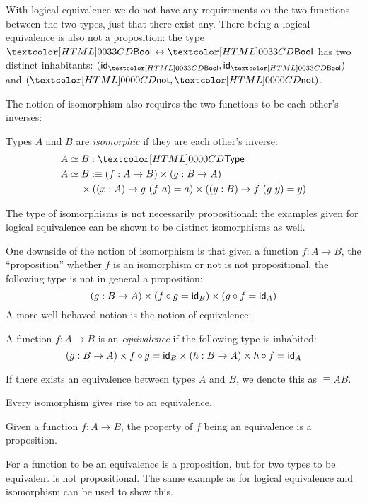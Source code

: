 With logical equivalence we do not have any requirements on the two
functions between the two types, just that there exist any. There
being a logical equivalence is also not a proposition: the type
$\boolty \logequiv \boolty$ has two distinct inhabitants:
$(\id_{\boolty} , \id_{\boolty})$ and $(\boolnot , \boolnot)$.

The notion of isomorphism also requires the two functions to be
each other's inverses:
\begin{definition}[Isomorphism]
  Types $A$ and $B$ are \emph{isomorphic} if they are each other's
  inverse:
  \begin{align*}
    &\Iso{A}{B} : \Type \\
    &\Iso{A}{B} \ddefeq (f : A \to B) \times (g : B \to A)  \\
    &\ \ \ \ \ \ \times ((x : A) \to g\ (f\ a) = a) \times ((y : B) \to f\ (g\ y) = y)
  \end{align*}
\end{definition}

The type of isomorphisms is not necessarily propositional: the
examples given for logical equivalence can be shown to be distinct
isomorphisms as well.

One downside of the notion of isomorphism is that given a function
$f : A \to B$, the ``proposition'' whether $f$ is an isomorphism or
not is not propositional, \ie the following type is not in general a
proposition:
$$
(g : B \to A) \times (f \circ g = \id_B) \times (g \circ f = \id_A)
$$
A more well-behaved notion is the notion of equivalence:
\begin{definition}[Equivalence]
  A function $f : A \to B$ is an \emph{equivalence} if the following
  type is inhabited:
  $$
  (g : B \to A) \times f \circ g = \id_B \times (h : B \to A) \times h \circ f = \id_A
  $$
  
  If there exists an equivalence between types $A$ and $B$, we denote
  this as $\Equiv{A}{B}$.
\end{definition}

\begin{proposition}
  Every isomorphism gives rise to an equivalence.
\end{proposition}

\begin{proposition}
  Given a function $f : A \to B$, the property of $f$ being an
  equivalence is a proposition.
\end{proposition}

For a function to be an equivalence is a proposition, but for two
types to be equivalent is not propositional. The same example as for
logical equivalence and isomorphism can be used to show this.

